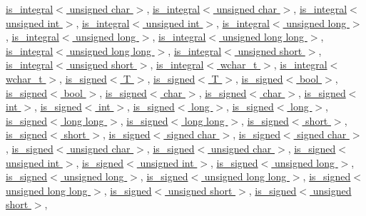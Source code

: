 \hyperlink{structis__integral_3_01unsigned_01char_01_4}{is\+\_\+integral$<$ unsigned char $>$}, \hyperlink{structis__integral_3_01unsigned_01char_01_4}{is\+\_\+integral$<$ unsigned char $>$}, \hyperlink{structis__integral_3_01unsigned_01int_01_4}{is\+\_\+integral$<$ unsigned int $>$}, \hyperlink{structis__integral_3_01unsigned_01int_01_4}{is\+\_\+integral$<$ unsigned int $>$}, \hyperlink{structis__integral_3_01unsigned_01long_01_4}{is\+\_\+integral$<$ unsigned long $>$}, \hyperlink{structis__integral_3_01unsigned_01long_01_4}{is\+\_\+integral$<$ unsigned long $>$}, \hyperlink{structis__integral_3_01unsigned_01long_01long_01_4}{is\+\_\+integral$<$ unsigned long long $>$}, \hyperlink{structis__integral_3_01unsigned_01long_01long_01_4}{is\+\_\+integral$<$ unsigned long long $>$}, \hyperlink{structis__integral_3_01unsigned_01short_01_4}{is\+\_\+integral$<$ unsigned short $>$}, \hyperlink{structis__integral_3_01unsigned_01short_01_4}{is\+\_\+integral$<$ unsigned short $>$}, \hyperlink{structis__integral_3_01wchar__t_01_4}{is\+\_\+integral$<$ wchar\+\_\+t $>$}, \hyperlink{structis__integral_3_01wchar__t_01_4}{is\+\_\+integral$<$ wchar\+\_\+t $>$}, \hyperlink{structis__signed}{is\+\_\+signed$<$ T $>$}, \hyperlink{structis__signed}{is\+\_\+signed$<$ T $>$}, \hyperlink{structis__signed_3_01bool_01_4}{is\+\_\+signed$<$ bool $>$}, \hyperlink{structis__signed_3_01bool_01_4}{is\+\_\+signed$<$ bool $>$}, \hyperlink{structis__signed_3_01char_01_4}{is\+\_\+signed$<$ char $>$}, \hyperlink{structis__signed_3_01char_01_4}{is\+\_\+signed$<$ char $>$}, \hyperlink{structis__signed_3_01int_01_4}{is\+\_\+signed$<$ int $>$}, \hyperlink{structis__signed_3_01int_01_4}{is\+\_\+signed$<$ int $>$}, \hyperlink{structis__signed_3_01long_01_4}{is\+\_\+signed$<$ long $>$}, \hyperlink{structis__signed_3_01long_01_4}{is\+\_\+signed$<$ long $>$}, \hyperlink{structis__signed_3_01long_01long_01_4}{is\+\_\+signed$<$ long long $>$}, \hyperlink{structis__signed_3_01long_01long_01_4}{is\+\_\+signed$<$ long long $>$}, \hyperlink{structis__signed_3_01short_01_4}{is\+\_\+signed$<$ short $>$}, \hyperlink{structis__signed_3_01short_01_4}{is\+\_\+signed$<$ short $>$}, \hyperlink{structis__signed_3_01signed_01char_01_4}{is\+\_\+signed$<$ signed char $>$}, \hyperlink{structis__signed_3_01signed_01char_01_4}{is\+\_\+signed$<$ signed char $>$}, \hyperlink{structis__signed_3_01unsigned_01char_01_4}{is\+\_\+signed$<$ unsigned char $>$}, \hyperlink{structis__signed_3_01unsigned_01char_01_4}{is\+\_\+signed$<$ unsigned char $>$}, \hyperlink{structis__signed_3_01unsigned_01int_01_4}{is\+\_\+signed$<$ unsigned int $>$}, \hyperlink{structis__signed_3_01unsigned_01int_01_4}{is\+\_\+signed$<$ unsigned int $>$}, \hyperlink{structis__signed_3_01unsigned_01long_01_4}{is\+\_\+signed$<$ unsigned long $>$}, \hyperlink{structis__signed_3_01unsigned_01long_01_4}{is\+\_\+signed$<$ unsigned long $>$}, \hyperlink{structis__signed_3_01unsigned_01long_01long_01_4}{is\+\_\+signed$<$ unsigned long long $>$}, \hyperlink{structis__signed_3_01unsigned_01long_01long_01_4}{is\+\_\+signed$<$ unsigned long long $>$}, \hyperlink{structis__signed_3_01unsigned_01short_01_4}{is\+\_\+signed$<$ unsigned short $>$}, \hyperlink{structis__signed_3_01unsigned_01short_01_4}{is\+\_\+signed$<$ unsigned short $>$}, 